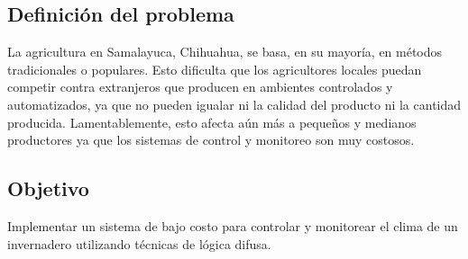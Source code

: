\subsection{Definición del problema}





La agricultura en Samalayuca, Chihuahua, se basa, en su mayoría, en métodos tradicionales o populares. Esto dificulta que los agricultores
locales puedan competir contra extranjeros que producen en ambientes controlados y automatizados, ya que no pueden igualar ni la calidad 
del producto ni la cantidad producida. Lamentablemente, esto afecta aún más a pequeños y medianos productores ya que los sistemas de control 
y monitoreo son muy costosos.



\subsection{Objetivo}
Implementar un sistema de bajo costo para controlar y monitorear el clima de un invernadero utilizando técnicas de lógica difusa.